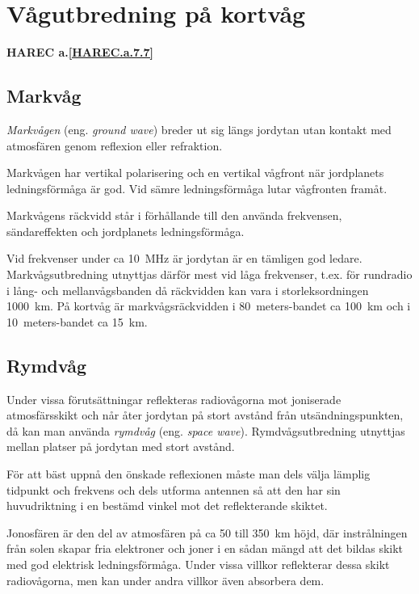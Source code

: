 \section{Vågutbredning på kortvåg}
\textbf{
HAREC a.\ref{HAREC.a.7.7}\label{myHAREC.a.7.7}
}

\subsection{Markvåg}

\emph{Markvågen} (eng. \emph{ground wave}) breder ut sig längs jordytan utan
kontakt med atmosfären genom reflexion eller refraktion.

Markvågen har vertikal polarisering och en vertikal vågfront när
jordplanets ledningsförmåga är god.
Vid sämre ledningsförmåga lutar vågfronten framåt.

Markvågens räckvidd står i förhållande till den använda frekvensen,
sändareffekten och jordplanets ledningsförmåga.

Vid frekvenser under ca 10~MHz är jordytan är en tämligen god ledare.
Markvågsutbredning utnyttjas därför mest vid låga frekvenser, t.ex. för
rundradio i lång- och mellanvågsbanden då räckvidden kan vara i
storleksordningen 1000~km.
På kortvåg är markvågsräckvidden i 80~meters-bandet ca 100~km och i
10~meters-bandet ca 15~km.

\subsection{Rymdvåg}

Under vissa förutsättningar reflekteras radiovågorna mot joniserade
atmosfärsskikt och når åter jordytan på stort avstånd från utsändningspunkten,
då kan man använda \emph{rymdvåg} (eng. \emph{space wave}).
Rymdvågsutbredning utnyttjas mellan platser på jordytan med stort avstånd.

För att bäst uppnå den önskade reflexionen måste man dels välja
lämplig tidpunkt och frekvens och dels utforma antennen så att den har
sin huvudriktning i en bestämd vinkel mot det reflekterande skiktet.

Jonosfären är den del av atmosfären på ca 50 till 350~km höjd, där
instrålningen från solen skapar fria elektroner och joner i en sådan
mängd att det bildas skikt med god elektrisk ledningsförmåga.
Under vissa villkor reflekterar dessa skikt radiovågorna, men kan under
andra villkor även absorbera dem.

